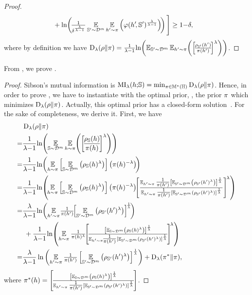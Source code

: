 \begin{noaddcontents}
\begin{proof}
\begin{align*}
    &+ \ln\!\LP\!\tfrac{1}{\delta^{\frac{\lambda}{\lambda{-}1}}}\EE_{\S'{\sim}\D^{\m}}\EE_{\h'{\sim} \P}\LP\varphi(\h'\!, \S')^{\frac{\lambda}{\lambda-1}}\RP\!\RP \Bigg]\ge 1{-}\delta,
\end{align*}
where by definition we have $\Renyi_{\lambda}(\rho\|\pi)=\frac{1}{\lambda{-}1}\!\ln\!\LP\EE_{\S'{\sim}\D^{\m}}\EE_{\h'{\sim} \P}\!\LP\LB\!\frac{\AQp (\h')}{\P(\h')}\!\RB^{\lambda}\RP\RP$.
\end{proof}
From , we prove .

\theoremmutualinfo*
\begin{proof}
Sibson's mutual information is $\MI_{\lambda}(\h{;}\S)=\min_{\P\in\M^{*}(\H)}\Renyi_{\lambda}(\rho\|\pi)$.
Hence, in order to prove , we have to instantiate  with the optimal prior, \ie, the prior $\P$ which minimizes $\Renyi_{\lambda}(\rho\|\pi)$.
Actually, this optimal prior has a closed-form solution~\citep{Verdu2015}.
For the sake of completeness, we derive it. First, we have
\begin{align*}
    &\Renyi_{\lambda}(\rho\|\pi)\\
    = &\frac{1}{\lambda{-}1}\!\ln\!\LP\EE_{\S\sim\D^{\m}}\EE_{\h\sim \P}\!\LP\LB\!\frac{\AQ(\h)}{\P(\h)}\!\RB^{\lambda}\RP\RP\\
    = &\frac{1}{\lambda{-}1}\!\ln\!\LP\EE_{\h\sim \P}\LB\EE_{\S\sim\D^{\m}}\LP\AQ(\h)^{\lambda}\RP\RB\LP\P(\h)^{-\lambda}\RP\!\RP\\
    = &\frac{1}{\lambda{-}1}\!\ln\!\LP\!\EE_{\h\sim \P}\LB\EE_{\S\sim\D^{\m}}\LP\AQ (\h)^{\lambda}\RP\RB\LP\P(\h)^{-\lambda}\RP\!\!\LB\tfrac{\EE_{\h'{\sim}\P}\tfrac{1}{\P(\h')}\LB\EE_{\S'{\sim}\D^{\m}}\LP\AQp (\h')^{\lambda}\RP\RB^{\frac{1}{\lambda}}}{\EE_{\h'{\sim}\P}\tfrac{1}{\P(\h')}\LB\EE_{\S'{\sim}\D^{\m}}\LP\AQp (\h')^{\lambda}\RP\RB^{\frac{1}{\lambda}}}\RB^{\!\lambda}\RP\\
    = &\frac{\lambda}{\lambda{-}1}\!\ln\!\LP\EE_{\h'{\sim}\P}\!\tfrac{1}{\P(\h')}\!\!\LB\EE_{\S'{\sim}\D^{\m}}\LP\AQp (\h')^{\lambda}\RP\RB^{\!\frac{1}{\lambda}}\!\RP\!\\
    &\hspace{0.1cm}+\frac{1}{\lambda{-}1}\!\ln\!\LP\EE_{\h\sim\P}\tfrac{1}{\P(\h)^{\lambda}}\!\!\LB \!\tfrac{\LB\EE_{\S\sim\D^{\m}}\LP\AQ (\h)^{\lambda}\RP\RB^{\frac{1}{\lambda}}}{\EE_{\h'{\sim}\P}\!\!\tfrac{1}{\P(\h')}\LB\EE_{\S'{\sim}\D^{\m}}\LP\AQp (\h')^{\lambda}\RP\RB^{\frac{1}{\lambda}}}\!\RB^{\!\lambda} \RP\\
    = &\frac{\lambda}{\lambda{-}1}\ln\LP\EE_{\h'{\sim}\P}\tfrac{1}{\P(\h')}\LB\EE_{\S'{\sim}\D^{\m}}\LP\AQp (\h')^{\lambda}\RP\RB^{\frac{1}{\lambda}}\RP + \Renyi_{\lambda}(\P^{*}\| \P),
\end{align*}
where $\P^*(\h)=\LB \!\tfrac{\LB\EE_{\S\sim\D^{\m}}\LP\AQ (\h)^{\lambda}\RP\RB^{\frac{1}{\lambda}}}{\EE_{\h'{\sim}\P}\tfrac{1}{\P(\h')}\LB\EE_{\S'{\sim}\D^{\m}}\LP\AQp (\h')^{\lambda}\RP\RB^{\frac{1}{\lambda}}}\!\RB$.


\end{proof}
\end{noaddcontents}
